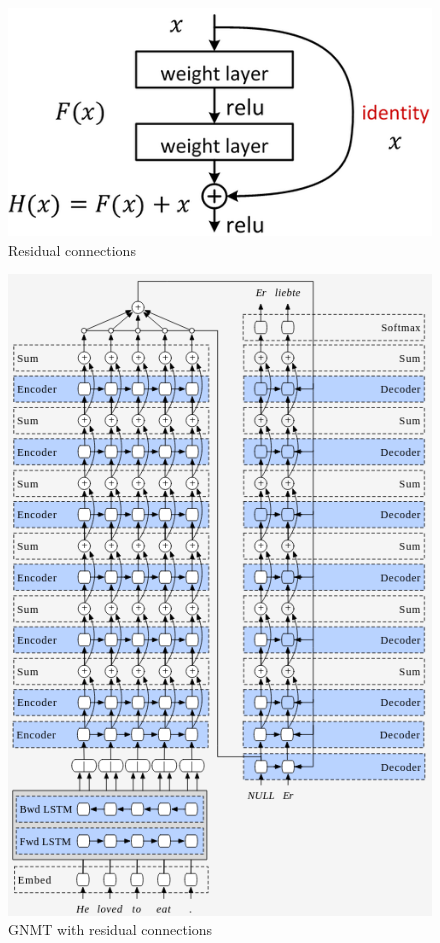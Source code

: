 \documentclass[a4paper]{article}
\begin{document}
\begin{figure}
  \centering
  \includegraphics[width=.9\linewidth]{img/residual.png}
  \caption{Residual connections}
  \label{fig:residual}
\end{figure}


\begin{figure}
  \centering
  \includegraphics[width=.9\linewidth]{img/residual_gnmt.png}
  \caption{GNMT with residual connections}
  \label{fig:gnmtres}
\end{figure}
\end{document}
